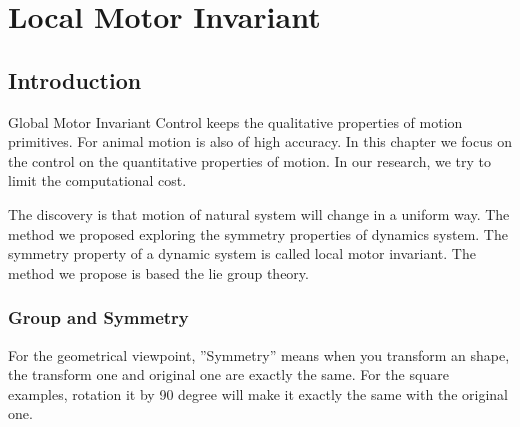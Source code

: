 \chapter{Local Motor Invariant}
\label{chap:li}

\ifpdf
    \graphicspath{{LocalInvariant/LocalInvariantFigs/PNG/}{LocalInvariant/LocalInvariantFigs/PDF/}{LocalInvariant/LocalInvariantFigs/}}
\else
    \graphicspath{{LocalInvariant/LocalInvariantFigs/EPS/}{LocalInvariant/LocalInvariantFigs/}}
\fi

\section{Introduction}
Global Motor Invariant Control keeps the qualitative properties of motion primitives.
For animal motion is also of high accuracy.
In this chapter we focus on the control on the quantitative properties of motion.
In our research, we try to limit the computational cost.


The discovery is that motion of natural system will change in a uniform way.
The method we proposed exploring the symmetry properties of dynamics system.
The symmetry property of a dynamic system is called local motor invariant.
The method we propose is based the lie group theory.

\subsection{Group and Symmetry}
For the geometrical viewpoint, ''Symmetry''  means when you transform an shape, the transform one and original one are exactly the same.
For the square examples, rotation it by 90 degree will make it exactly the same with the original one.



